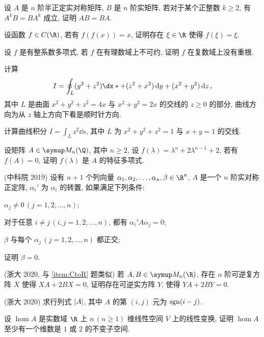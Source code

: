 \begin{exercise}[resume=exer]
\begin{answer}
      \end{answer}
      \item 设 $ A $ 是 $ n $ 阶半正定实对称矩阵, $ B $ 是 $ n $ 阶实矩阵, 若对于某个正整数 $ k \ge 2 $, 有 $ A^{k}B = BA^{k} $ 成立, 证明 $ AB = BA $.
      \item 设函数 $ f \in C(\R) $, 若有 $ f(f(x)) = x $, 证明存在 $ \xi\in \R $ 使得 $ f(\xi) = \xi $.
      \item 设 $ f $ 是有整系数多项式, 若 $ f $ 在有理数域上不可约, 证明 $ f $ 在复数域上没有重根.
      \item 计算
      \begin{align*}
          I = \oint_{L} (y^{2} + z^{2}) \dx* + (z^{2} + x^{2}) \dd{y} + (x^{2} + y^{2}) \dd{z},
      \end{align*}
      其中 $ L $ 是曲面 $ x^{2} + y^{2} + z^{2} = 4x $ 与 $ x^{2} + y^{2} = 2x $ 的交线的 $ z \ge 0 $ 的部分, 曲线方向为从 $ z $ 轴上方向下看是顺时针方向.
      \item 计算曲线积分 $ I = \int_{L} z^{2} \dd{s} $, 其中 $ L $ 为 $ x^{2} + y^{2} + z^{2} = 1 $ 与 $ x + y = 1 $ 的交线.
      \item 设矩阵 $ A \in \MM[\Q] $, 其中 $ n\ge 2 $, 设 $ f(\lambda) = \lambda^{n} + 2\lambda^{n-1} + 2 $, 若有 $ f(A) = 0 $, 证明 $ f(\lambda) $ 是 $ A $ 的特征多项式.
      \item
      \item (中科院 2019) 设有 $ n + 1 $ 个列向量 $ \alpha_{1}, \alpha_{2}, \dots, \alpha_{n}, \beta \in \R^{n} $, $ A $ 是一个 $ n $ 阶实对称正定阵, $ \alpha_{i}' $ 为 $ \alpha_{i} $ 的转置, 如果满足下列条件:
      \begin{exercise}
          \item $ \alpha_{j} \ne 0\, (j = 1, 2, \dots, n) $;
          \item 对于任意 $ i \ne j \,(i, j = 1, 2, \dots, n) $, 都有 $ \alpha_{i}' A \alpha_{j} = 0 $;
          \item $ \beta $ 与每个 $ \alpha_{j}\,(j = 1, 2, \dots, n) $ 都正交;
      \end{exercise}
      证明 $ \beta = 0 $.
      \item (浙大 2020, 与 \ref{item:CtoR} 题类似) 若 $ A, B \in \MM $, 存在 $ n $ 阶可逆复方阵 $ X $ 使得 $ XA + 2BX = 0 $, 证明存在可逆实方阵 $ Y $, 使得 $ YA + 2BY = 0 $.
      \item (浙大 2020) 求行列式 $ \abs{A} $, 其中 $ A $ 的第 $ (i, j) $ 元为 $ \operatorname{sgn}(i - j) $.
      \item  设 $ \hom{A} $ 是实数域 $ \R $ 上 $ n\,(n\ge 1) $ 维线性空间 $ V $ 上的线性变换, 证明 $ \hom{A} $ 至少有一个维数是 $ 1 $ 或 $ 2 $ 的不变子空间.

\end{exercise}
